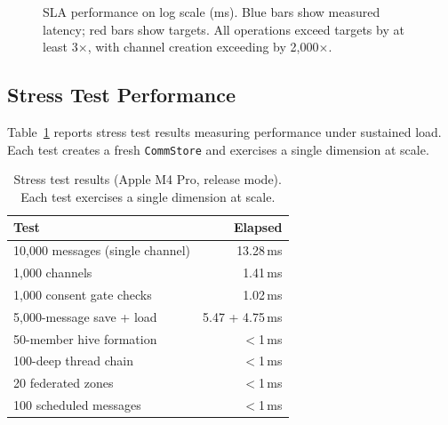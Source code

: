 \documentclass[10pt, twocolumn]{article}
\begin{document}
\begin{figure}[t]
\centering
{}
\caption{SLA performance on log scale (ms). Blue bars show measured latency; red bars show targets. All operations exceed targets by at least 3$\times$, with channel creation exceeding by 2{,}000$\times$.}
\label{fig:sla}
\end{figure}


\subsection{Stress Test Performance}

Table~\ref{tab:stress} reports stress test results measuring performance under sustained load. Each test creates a fresh \texttt{CommStore} and exercises a single dimension at scale.

\begin{table}[t]
\caption{Stress test results (Apple M4 Pro, release mode). Each test exercises a single dimension at scale.}
\label{tab:stress}
\centering
\small
\begin{tabular}{@{}lr@{}}
\toprule
\textbf{Test} & \textbf{Elapsed} \\
\midrule
10{,}000 messages (single channel) & 13.28\,ms \\
1{,}000 channels & 1.41\,ms \\
1{,}000 consent gate checks & 1.02\,ms \\
5{,}000-message save + load & 5.47 + 4.75\,ms \\
50-member hive formation & $<$1\,ms \\
100-deep thread chain & $<$1\,ms \\
20 federated zones & $<$1\,ms \\
100 scheduled messages & $<$1\,ms \\
\bottomrule
\end{tabular}
\end{table}
\end{document}
